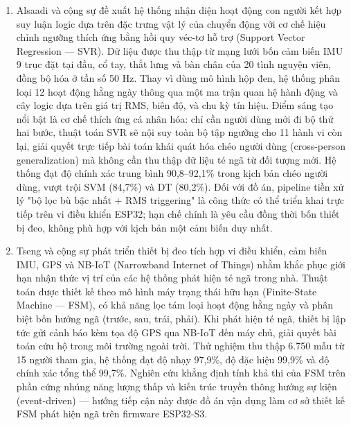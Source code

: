 \documentclass[../DoAn.tex]{subfiles}
\begin{document}
\begin{enumerate}[label=\arabic*)]

\item Alsaadi và cộng sự \cite{alsaadi2024logical} đề xuất hệ thống nhận diện hoạt động con người kết hợp suy luận logic dựa trên đặc trưng vật lý của chuyển động với cơ chế hiệu chỉnh ngưỡng thích ứng bằng hồi quy véc-tơ hỗ trợ (Support Vector Regression --- SVR). Dữ liệu được thu thập từ mạng lưới bốn cảm biến IMU 9 trục đặt tại đầu, cổ tay, thắt lưng và bàn chân của 20 tình nguyện viên, đồng bộ hóa ở tần số 50 Hz. Thay vì dùng mô hình hộp đen, hệ thống phân loại 12 hoạt động hằng ngày thông qua một ma trận quan hệ hành động và cây logic dựa trên giá trị RMS, biên độ, và chu kỳ tín hiệu. Điểm sáng tạo nổi bật là cơ chế thích ứng cá nhân hóa: chỉ cần người dùng mới đi bộ thử hai bước, thuật toán SVR sẽ nội suy toàn bộ tập ngưỡng cho 11 hành vi còn lại, giải quyết trực tiếp bài toán khái quát hóa chéo người dùng (cross-person generalization) mà không cần thu thập dữ liệu té ngã từ đối tượng mới. Hệ thống đạt độ chính xác trung bình 90,8--92,1\% trong kịch bản chéo người dùng, vượt trội SVM (84,7\%) và DT (80,2\%). Đối với đồ án, pipeline tiền xử lý "bộ lọc bù bậc nhất + RMS triggering" là công thức có thể triển khai trực tiếp trên vi điều khiển ESP32; hạn chế chính là yêu cầu đồng thời bốn thiết bị đeo, không phù hợp với kịch bản một cảm biến duy nhất.

\item Tseng và cộng sự \cite{tseng2025wearable} phát triển thiết bị đeo tích hợp vi điều khiển, cảm biến IMU, GPS và NB-IoT (Narrowband Internet of Things) nhằm khắc phục giới hạn nhận thức vị trí của các hệ thống phát hiện té ngã trong nhà. Thuật toán được thiết kế theo mô hình máy trạng thái hữu hạn (Finite-State Machine --- FSM), có khả năng lọc tám loại hoạt động hằng ngày và phân biệt bốn hướng ngã (trước, sau, trái, phải). Khi phát hiện té ngã, thiết bị lập tức gửi cảnh báo kèm tọa độ GPS qua NB-IoT đến máy chủ, giải quyết bài toán cứu hộ trong môi trường ngoài trời. Thử nghiệm thu thập 6.750 mẫu từ 15 người tham gia, hệ thống đạt độ nhạy 97,9\%, độ đặc hiệu 99,9\% và độ chính xác tổng thể 99,7\%. Nghiên cứu khẳng định tính khả thi của FSM trên phần cứng nhúng năng lượng thấp và kiến trúc truyền thông hướng sự kiện (event-driven) --- hướng tiếp cận này được đồ án vận dụng làm cơ sở thiết kế FSM phát hiện ngã trên firmware ESP32-S3.


\end{enumerate}
\end{document}
